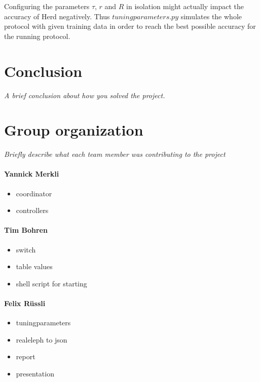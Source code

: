 \documentclass[11pt,oneside,a4paper]{article}
\newcommand{\hint}[1]{{\color{blue} \em #1}}
\begin{document}
Configuring the parameters $\tau$, $r$ and $R$ in isolation might actually impact the accuracy of Herd negatively. Thus $tuningparameters.py$ simulates the whole protocol with given training data in order to reach the best possible accuracy for the running protocol.\\


\section{Conclusion}
\hint{A brief conclusion about how you solved the project.} \\

\label{lastpage} %
\clearpage
{}



\clearpage
\appendix
{}

\section{Group organization}
\hint{Briefly describe what each team member was contributing to the project}

\paragraph{Yannick Merkli}
\begin{itemize}
	\item coordinator
	\item controllers
\end{itemize}


\paragraph{Tim Bohren}
\begin{itemize}
	\item switch
	\item table values
	\item shell script for starting
\end{itemize}

\paragraph{Felix Rüssli}
\begin{itemize}
	\item tuningparameters
	\item realeleph to json
	\item report
	\item presentation
\end{itemize}
\end{document}
